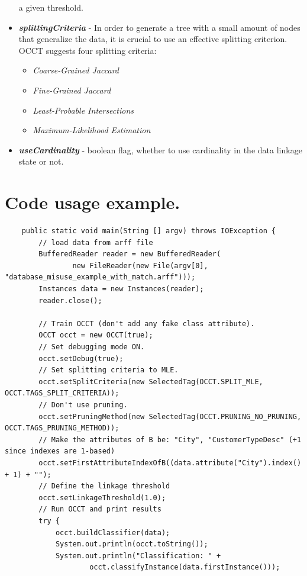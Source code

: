 \documentclass[a4paper,12pt]{article}
\begin{document}
\begin{spacing}{1.5}
\begin{itemize}
  a given threshold.
  \item \textbf{{\em splittingCriteria}} - In order to generate a tree with a small amount of nodes that generalize the data,
  it is crucial to use an effective splitting criterion. OCCT suggests four splitting criteria:
  \begin{itemize}
    \item {\em Coarse-Grained Jaccard}
    \item {\em Fine-Grained Jaccard}
    \item {\em Least-Probable Intersections}
    \item {\em Maximum-Likelihood Estimation}
  \end{itemize}
  \item \textbf{{\em useCardinality}} - boolean flag, whether to use cardinality in the data linkage state or not.
\end{itemize}


\clearpage
\section{Code usage example.}
\begin{lstlisting}
	public static void main(String [] argv) throws IOException {
		// load data from arff file
		BufferedReader reader = new BufferedReader(
				new FileReader(new File(argv[0], "database_misuse_example_with_match.arff")));
		Instances data = new Instances(reader);
		reader.close();

        // Train OCCT (don't add any fake class attribute).
		OCCT occt = new OCCT(true);
        // Set debugging mode ON.
		occt.setDebug(true);
        // Set splitting criteria to MLE.
        occt.setSplitCriteria(new SelectedTag(OCCT.SPLIT_MLE, OCCT.TAGS_SPLIT_CRITERIA));
        // Don't use pruning.
        occt.setPruningMethod(new SelectedTag(OCCT.PRUNING_NO_PRUNING, OCCT.TAGS_PRUNING_METHOD));
        // Make the attributes of B be: "City", "CustomerTypeDesc" (+1 since indexes are 1-based)
		occt.setFirstAttributeIndexOfB((data.attribute("City").index() + 1) + "");
        // Define the linkage threshold
		occt.setLinkageThreshold(1.0);
        // Run OCCT and print results
        try {
			occt.buildClassifier(data);
			System.out.println(occt.toString());
			System.out.println("Classification: " +
					occt.classifyInstance(data.firstInstance()));


\end{lstlisting}
\end{spacing}
\end{document}
